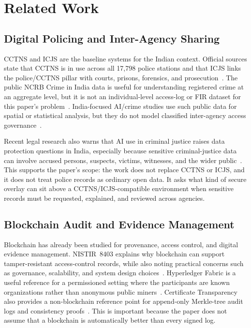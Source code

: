 \section{Related Work}
\label{sec:related}

\subsection{Digital Policing and Inter-Agency Sharing}

CCTNS and ICJS are the baseline systems for the Indian context. Official
sources state that CCTNS is in use across all 17,798 police stations and that
ICJS links the police/CCTNS pillar with courts, prisons, forensics, and
prosecution~\cite{pib_cctns_2026,mha_icjs_2026}. The public NCRB Crime in
India data is useful for understanding registered crime at an aggregate level,
but it is not an individual-level access-log or FIR dataset for this paper's
problem~\cite{ncrb_2023}. India-focused AI/crime studies use such public data
for spatial or statistical analysis, but they do not model classified
inter-agency access governance~\cite{sharma_india_crime_2023,naick_murder_xai_2024,reza_crix_2025}.

Recent legal research also warns that AI use in criminal justice raises data
protection questions in India, especially because sensitive criminal-justice
data can involve accused persons, suspects, victims, witnesses, and the wider
public~\cite{anbarasi_ai_criminal_justice_2026}. This supports the paper's
scope: the work does not replace CCTNS or ICJS, and it does not treat police
records as ordinary open data. It asks what kind of secure overlay can sit
above a CCTNS/ICJS-compatible environment when sensitive records must be requested,
explained, and reviewed across agencies.

\subsection{Blockchain Audit and Evidence Management}

Blockchain has already been studied for provenance, access control, and digital
evidence management. NISTIR~8403 explains why blockchain can support
tamper-resistant access-control records, while also noting practical concerns
such as governance, scalability, and system design choices~\cite{nist_blockchain_access_2022}.
Hyperledger Fabric is a useful reference for a permissioned setting where the
participants are known organizations rather than anonymous public
miners~\cite{androulaki_fabric_2018}. Certificate Transparency also provides a
non-blockchain reference point for append-only Merkle-tree audit logs and
consistency proofs~\cite{laurie_ct_2013}. This is important because the paper
does not assume that a blockchain is automatically better than every signed log.

